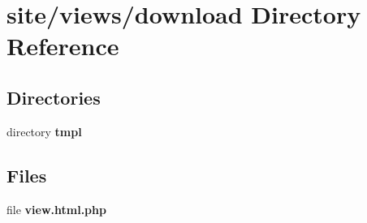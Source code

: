 \section{site/views/download Directory Reference}
\label{dir_475e019d357eb8838955e9d5b68f7e2d}
\subsection*{Directories}
\begin{DoxyCompactItemize}
\item 
directory \textbf{ tmpl}
\end{DoxyCompactItemize}
\subsection*{Files}
\begin{DoxyCompactItemize}
\item 
file \textbf{ view.\+html.\+php}
\end{DoxyCompactItemize}
